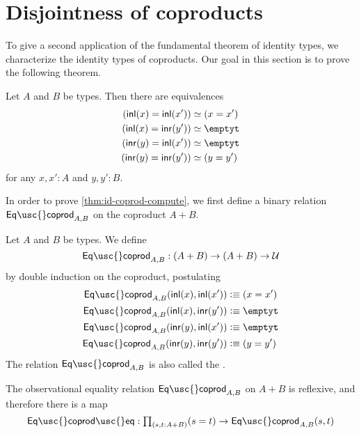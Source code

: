 \section{Disjointness of coproducts}

To give a second application of the fundamental theorem of identity types, we characterize the identity types of coproducts. Our goal in this section is to prove the following theorem.

\begin{thm}\label{thm:id-coprod-compute}
Let $A$ and $B$ be types. Then there are equivalences
\begin{align*}
(\inl(x)=\inl(x')) & \eqvsym (x = x')\\
(\inl(x)=\inr(y')) & \eqvsym \emptyt \\
(\inr(y)=\inl(x')) & \eqvsym \emptyt \\
(\inr(y)=\inr(y')) & \eqvsym (y=y')
\end{align*}
for any $x,x':A$ and $y,y':B$.
\end{thm}

In order to prove \cref{thm:id-coprod-compute}, we first define
a binary relation $\mathsf{Eq\usc{}coprod}_{A,B}$ on the coproduct $A+B$.

\begin{defn}
Let $A$ and $B$ be types. We define 
\begin{equation*}
\mathsf{Eq\usc{}coprod}_{A,B} : (A+B)\to (A+B)\to\UU
\end{equation*}
by double induction on the coproduct, postulating
\begin{align*}
\mathsf{Eq\usc{}coprod}_{A,B}(\inl(x),\inl(x')) & \defeq (x=x') \\
\mathsf{Eq\usc{}coprod}_{A,B}(\inl(x),\inr(y')) & \defeq \emptyt \\
\mathsf{Eq\usc{}coprod}_{A,B}(\inr(y),\inl(x')) & \defeq \emptyt \\
\mathsf{Eq\usc{}coprod}_{A,B}(\inr(y),\inr(y')) & \defeq (y=y')
\end{align*}
The relation $\mathsf{Eq\usc{}coprod}_{A,B}$ is also called the .
\end{defn}

\begin{lem}
The observational equality relation $\mathsf{Eq\usc{}coprod}_{A,B}$ on $A+B$ is reflexive, and therefore there is a map
\begin{equation*}
\mathsf{Eq\usc{}coprod\usc{}eq}:\prd{s,t:A+B} (s=t)\to \mathsf{Eq\usc{}coprod}_{A,B}(s,t)
\end{equation*}
\end{lem}

